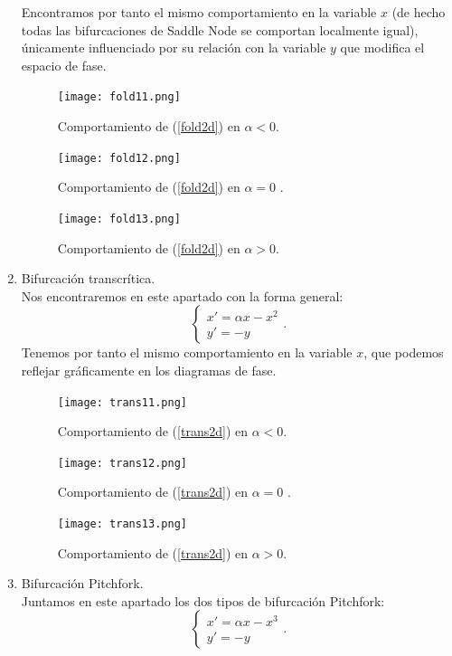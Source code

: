 \begin{enumerate}
	Encontramos por tanto el mismo comportamiento en la variable $x$ (de hecho todas las bifurcaciones de Saddle Node se comportan localmente igual), únicamente influenciado por su relación con la variable $y$ que modifica el espacio de fase.
	\begin{figure}[H]
		\centering
		\texttt{[image: fold11.png]}
		\caption{Comportamiento de (\ref{fold2d}) en $\alpha<0$. }
	\end{figure}
	\begin{figure}[H]
		\centering
		\texttt{[image: fold12.png]}
		\caption{Comportamiento de (\ref{fold2d}) en $\alpha=0$ .}
	\end{figure}
	\begin{figure}[H]
		\centering
		\texttt{[image: fold13.png]}
		\caption{Comportamiento de (\ref{fold2d}) en $\alpha>0$. }
	\end{figure}
	\item Bifurcación transcrítica. \\
	Nos encontraremos en este apartado con la forma general:
	\begin{equation}
	\left \{ \begin{matrix}x'=\alpha x-x^2 \\y'=-y\end{matrix}\right .. 
	\label{trans2d}
	\end{equation}
	Tenemos por tanto el mismo comportamiento en la variable $x$, que podemos reflejar gráficamente en los diagramas de fase. 
	\begin{figure}[H]
		\centering
		\texttt{[image: trans11.png]}
		\caption{Comportamiento de (\ref{trans2d}) en $\alpha<0$. }
	\end{figure}
	\begin{figure}[H]
		\centering
		\texttt{[image: trans12.png]}
		\caption{Comportamiento de (\ref{trans2d}) en $\alpha=0$ .}
	\end{figure}
	\begin{figure}[H]
		\centering
		\texttt{[image: trans13.png]}
		\caption{Comportamiento de (\ref{trans2d}) en $\alpha>0$. } 
	\end{figure}
	\item Bifurcación Pitchfork. \\
	Juntamos en este apartado los dos tipos de bifurcación Pitchfork:
	\begin{equation}
	\left\{\begin{matrix}x'=\alpha x-x^3 \\y'=-y\end{matrix}\right..
	\label{pitch2d}

\end{equation}
\end{enumerate}
